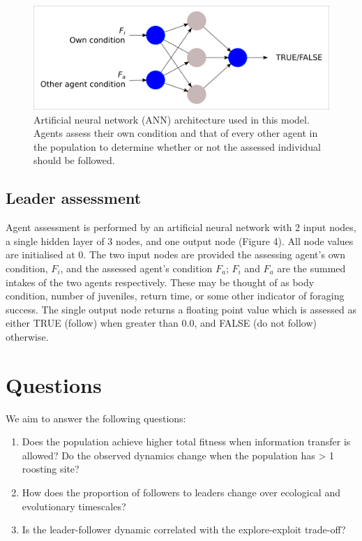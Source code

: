 \begin{figure}
\centering
\includegraphics{fig_modesc_infomove.png}
\caption{Artificial neural network (ANN) architecture used in this
model. Agents assess their own condition and that of every other agent
in the population to determine whether or not the assessed individual
should be followed.}
\end{figure}

\hypertarget{leader-assessment}{%
\subsection{Leader assessment}\label{leader-assessment}}

Agent assessment is performed by an artificial neural network with 2
input nodes, a single hidden layer of 3 nodes, and one output node
(Figure 4). All node values are initialised at 0. The two input nodes
are provided the assessing agent's own condition, \(F_i\), and the
assessed agent's condition \(F_a\); \(F_i\) and \(F_a\) are the summed
intakes of the two agents respectively. These may be thought of as body
condition, number of juveniles, return time, or some other indicator of
foraging success. The single output node returns a floating point value
which is assessed as either TRUE (follow) when greater than 0.0, and
FALSE (do not follow) otherwise.

\hypertarget{questions}{%
\section{Questions}\label{questions}}

We aim to answer the following questions:

\begin{enumerate}
\def\labelenumi{\arabic{enumi}.}
\tightlist
\item
  Does the population achieve higher total fitness when information
  transfer is allowed? Do the observed dynamics change when the
  population has \textgreater{} 1 roosting site?
\item
  How does the proportion of followers to leaders change over ecological
  and evolutionary timescales?
\item
  Is the leader-follower dynamic correlated with the explore-exploit
  trade-off?
\end{enumerate}

